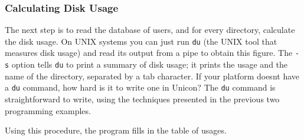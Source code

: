 \subsubsection{Calculating Disk Usage}

The next step is to read the database of users, and for every
directory, calculate the disk usage. On
UNIX systems you can just run \texttt{du} (the UNIX tool that
measures disk usage) and read its output from a pipe to obtain this
figure. The \texttt{{}-s} option tells \texttt{du} to print a summary
of disk usage; it prints the usage and the name of the directory,
separated by a tab character. If your platform doesn{\textquotesingle}t
have a \texttt{du} command, how hard is it to write one in Unicon? The
\texttt{du} command is straightforward to write, using
the techniques presented in the previous two programming examples.


Using this procedure, the program fills in the table of usages.


